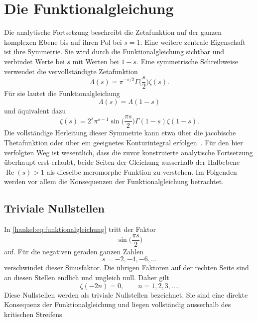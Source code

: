 \section{Die Funktionalgleichung
\label{hankel:section:funktionalgleichung}}

Die analytische Fortsetzung beschreibt die Zetafunktion auf der ganzen komplexen Ebene bis auf ihren Pol bei $s=1$. 
Eine weitere zentrale Eigenschaft ist ihre Symmetrie. 
Sie wird durch die Funktionalgleichung sichtbar und verbindet Werte bei $s$ mit Werten bei $1-s$.
Eine symmetrische Schreibweise verwendet die vervollständigte Zetafunktion
\begin{equation}
\Lambda(s)
=
\pi^{-s/2}
\Gamma\biggl(\frac{s}{2}\biggr)
\zeta(s).
\label{hankel:eq:lambda-definition}
\end{equation}
Für sie lautet die Funktionalgleichung
\begin{equation}
\boxed{
\Lambda(s)=\Lambda(1-s)
}
\label{hankel:eq:funktionalgleichung-symmetrisch}
\end{equation}
und äquivalent dazu
\begin{equation}
\boxed{
\zeta(s)
=
2^s\pi^{s-1}
\sin\biggl(\frac{\pi s}{2}\biggr)
\Gamma(1-s)
\zeta(1-s).
}
\label{hankel:eq:funktionalgleichung}
\end{equation}
Die vollständige Herleitung dieser Symmetrie kann etwa über die jacobische Thetafunktion oder über ein geeignetes Konturintegral erfolgen~\cite{hankel:titchmarsh,hankel:edwards}. 
Für den hier verfolgten Weg ist wesentlich, dass die zuvor konstruierte analytische Fortsetzung überhaupt erst erlaubt, beide Seiten der Gleichung ausserhalb der Halbebene $\operatorname{Re}(s)>1$ als dieselbe meromorphe Funktion zu verstehen. 
Im Folgenden werden vor allem die Konsequenzen der
Funktionalgleichung betrachtet.

\subsection{Triviale Nullstellen}

In \eqref{hankel:eq:funktionalgleichung} tritt der Faktor
\begin{equation}
\sin\biggl(\frac{\pi s}{2}\biggr)
\label{hankel:eq:sinus-faktor-halbe}
\end{equation}
auf. 
Für die negativen geraden ganzen Zahlen
\begin{equation}
s=-2,-4,-6,\ldots
\label{hankel:eq:negative-gerade-zahlen}
\end{equation}
verschwindet dieser Sinusfaktor. 
Die übrigen Faktoren auf der rechten Seite sind an diesen Stellen endlich und ungleich null. 
Daher gilt
\begin{equation}
\zeta(-2n)=0,
\qquad
n=1,2,3,\ldots.
\label{hankel:eq:triviale-nullstellen}
\end{equation}
Diese Nullstellen werden als triviale Nullstellen bezeichnet. Sie sind eine direkte Konsequenz der Funktionalgleichung und liegen vollständig ausserhalb des kritischen Streifens.

